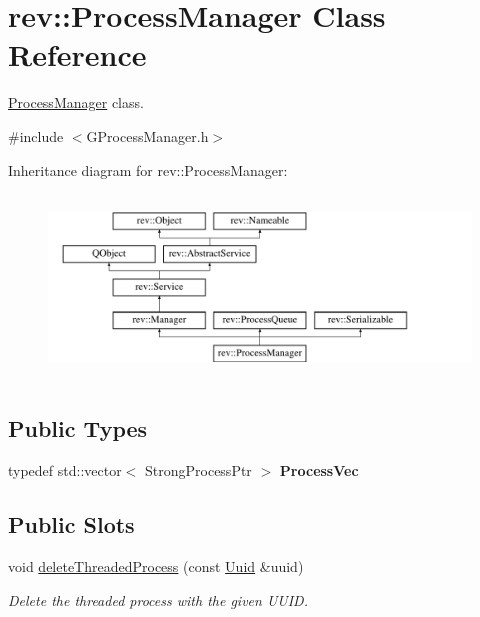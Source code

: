 \hypertarget{classrev_1_1_process_manager}{}\section{rev\+::Process\+Manager Class Reference}
\label{classrev_1_1_process_manager}


\mbox{\hyperlink{classrev_1_1_process_manager}{Process\+Manager}} class.  




{\ttfamily \#include $<$G\+Process\+Manager.\+h$>$}

Inheritance diagram for rev\+::Process\+Manager\+:\begin{figure}[H]
\begin{center}
\leavevmode
\includegraphics[height=4.929577cm]{classrev_1_1_process_manager}
\end{center}
\end{figure}
\subsection*{Public Types}
\begin{DoxyCompactItemize}
\item 
\mbox{\label{classrev_1_1_process_manager_a7313508170097ad275f4301bc3699b78}} 
typedef std\+::vector$<$ Strong\+Process\+Ptr $>$ {\bfseries Process\+Vec}
\end{DoxyCompactItemize}
\subsection*{Public Slots}
\begin{DoxyCompactItemize}
\item 
\mbox{\label{classrev_1_1_process_manager_ac28646c11ecb84a0f6de4518a2d936af}} 
void \mbox{\hyperlink{classrev_1_1_process_manager_ac28646c11ecb84a0f6de4518a2d936af}{delete\+Threaded\+Process}} (const \mbox{\hyperlink{classrev_1_1_uuid}{Uuid}} \&uuid)
\begin{DoxyCompactList}\small\item\em Delete the threaded process with the given U\+U\+ID. \end{DoxyCompactList}\end{DoxyCompactItemize}

